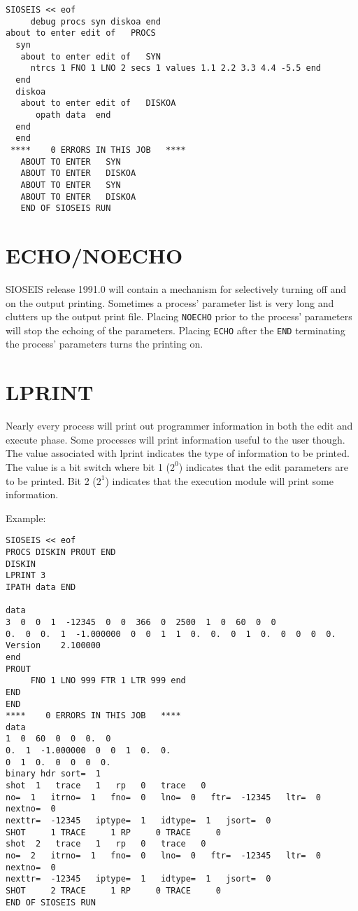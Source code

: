 \begin{verbatim}
SIOSEIS << eof
     debug procs syn diskoa end
about to enter edit of   PROCS
  syn
   about to enter edit of   SYN
     ntrcs 1 FNO 1 LNO 2 secs 1 values 1.1 2.2 3.3 4.4 -5.5 end
  end
  diskoa
   about to enter edit of   DISKOA
      opath data  end
  end
  end
 ****    0 ERRORS IN THIS JOB   ****
   ABOUT TO ENTER   SYN
   ABOUT TO ENTER   DISKOA
   ABOUT TO ENTER   SYN
   ABOUT TO ENTER   DISKOA
   END OF SIOSEIS RUN
\end{verbatim}

\section{ECHO/NOECHO}
\label{cmd_echo}

SIOSEIS release 1991.0 will contain a mechanism for selectively turning off and
on the output printing.  Sometimes a process' parameter list is very long and
clutters up the output print file.  Placing \texttt{NOECHO} prior to the
process' parameters will stop the echoing of the parameters.  Placing
\texttt{ECHO} after the \texttt{END} terminating the process' parameters turns
the printing on.


\section{LPRINT}
\label{cmd_lprint}
Nearly every process will print out programmer information in both the edit and
execute phase.  Some processes will print information useful to the user
though.  The value associated with lprint indicates the type of information to
be printed.  The value is a bit switch where bit 1 ($2^{0}$) indicates that the
edit parameters are to be printed.  Bit 2 ($2^{1}$) indicates that the
execution module will print some information.

Example:
\begin{verbatim}
SIOSEIS << eof
PROCS DISKIN PROUT END
DISKIN
LPRINT 3
IPATH data END

data
3  0  0  1  -12345  0  0  366  0  2500  1  0  60  0  0
0.  0  0.  1  -1.000000  0  0  1  1  0.  0.  0  1  0.  0  0  0  0.
Version    2.100000
end
PROUT
     FNO 1 LNO 999 FTR 1 LTR 999 end
END
END
****    0 ERRORS IN THIS JOB   ****
data
1  0  60  0  0  0.  0
0.  1  -1.000000  0  0  1  0.  0.
0  1  0.  0  0  0  0.
binary hdr sort=  1
shot  1   trace   1   rp   0   trace   0
no=  1   itrno=  1   fno=  0   lno=  0   ftr=  -12345   ltr=  0   nextno=  0
nexttr=  -12345   iptype=  1   idtype=  1   jsort=  0
SHOT     1 TRACE     1 RP     0 TRACE     0
shot  2   trace   1   rp   0   trace   0
no=  2   itrno=  1   fno=  0   lno=  0   ftr=  -12345   ltr=  0   nextno=  0
nexttr=  -12345   iptype=  1   idtype=  1   jsort=  0
SHOT     2 TRACE     1 RP     0 TRACE     0
END OF SIOSEIS RUN
\end{verbatim}

